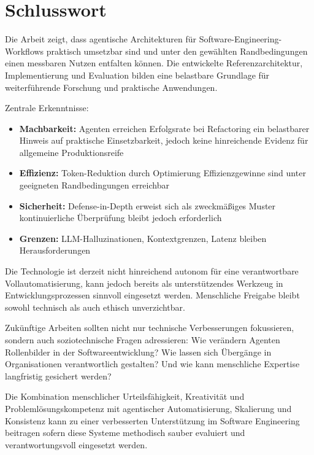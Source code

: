 \section{Schlusswort}

Die Arbeit zeigt, dass agentische Architekturen für Software-Engineering-Workflows praktisch umsetzbar sind und unter den gewählten Randbedingungen einen messbaren Nutzen entfalten können. Die entwickelte Referenzarchitektur, Implementierung und Evaluation bilden eine belastbare Grundlage für weiterführende Forschung und praktische Anwendungen.

Zentrale Erkenntnisse:

\begin{itemize}
  \item \textbf{Machbarkeit:} Agenten erreichen  Erfolgsrate bei Refactoring \textendash{} ein belastbarer Hinweis auf praktische Einsetzbarkeit, jedoch keine hinreichende Evidenz für allgemeine Produktionsreife
  \item \textbf{Effizienz:}  Token-Reduktion durch Optimierung \textendash{} Effizienzgewinne sind unter geeigneten Randbedingungen erreichbar
  \item \textbf{Sicherheit:} Defense-in-Depth erweist sich als zweckmäßiges Muster \textendash{} kontinuierliche Überprüfung bleibt jedoch erforderlich
  \item \textbf{Grenzen:} LLM-Halluzinationen, Kontextgrenzen, Latenz bleiben Herausforderungen
\end{itemize}

Die Technologie ist derzeit nicht hinreichend autonom für eine verantwortbare Vollautomatisierung, kann jedoch bereits als unterstützendes Werkzeug in Entwicklungsprozessen sinnvoll eingesetzt werden. Menschliche Freigabe bleibt sowohl technisch als auch ethisch unverzichtbar.

Zukünftige Arbeiten sollten nicht nur technische Verbesserungen fokussieren, sondern auch soziotechnische Fragen adressieren: Wie verändern Agenten Rollenbilder in der Softwareentwicklung? Wie lassen sich Übergänge in Organisationen verantwortlich gestalten? Und wie kann menschliche Expertise langfristig gesichert werden?

Die Kombination menschlicher Urteilsfähigkeit, Kreativität und Problemlösungskompetenz mit agentischer Automatisierung, Skalierung und Konsistenz kann zu einer verbesserten Unterstützung im Software Engineering beitragen \textendash{} sofern diese Systeme methodisch sauber evaluiert und verantwortungsvoll eingesetzt werden.

